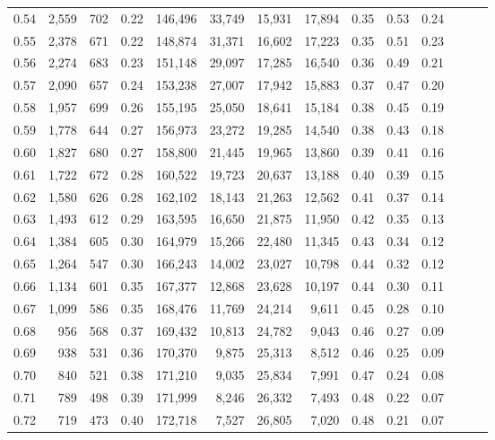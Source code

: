 \begin{tabular}{rrrrrrrrrrrrrr}
0.54 &  2,559 &  702 &  0.22 &  146,496 &   33,749 &  15,931 &  17,894 &  0.35 &  0.53 &      0.24 \\
0.55 &  2,378 &  671 &  0.22 &  148,874 &   31,371 &  16,602 &  17,223 &  0.35 &  0.51 &      0.23 \\
0.56 &  2,274 &  683 &  0.23 &  151,148 &   29,097 &  17,285 &  16,540 &  0.36 &  0.49 &      0.21 \\
0.57 &  2,090 &  657 &  0.24 &  153,238 &   27,007 &  17,942 &  15,883 &  0.37 &  0.47 &      0.20 \\
0.58 &  1,957 &  699 &  0.26 &  155,195 &   25,050 &  18,641 &  15,184 &  0.38 &  0.45 &      0.19 \\
0.59 &  1,778 &  644 &  0.27 &  156,973 &   23,272 &  19,285 &  14,540 &  0.38 &  0.43 &      0.18 \\
0.60 &  1,827 &  680 &  0.27 &  158,800 &   21,445 &  19,965 &  13,860 &  0.39 &  0.41 &      0.16 \\
0.61 &  1,722 &  672 &  0.28 &  160,522 &   19,723 &  20,637 &  13,188 &  0.40 &  0.39 &      0.15 \\
0.62 &  1,580 &  626 &  0.28 &  162,102 &   18,143 &  21,263 &  12,562 &  0.41 &  0.37 &      0.14 \\
0.63 &  1,493 &  612 &  0.29 &  163,595 &   16,650 &  21,875 &  11,950 &  0.42 &  0.35 &      0.13 \\
0.64 &  1,384 &  605 &  0.30 &  164,979 &   15,266 &  22,480 &  11,345 &  0.43 &  0.34 &      0.12 \\
0.65 &  1,264 &  547 &  0.30 &  166,243 &   14,002 &  23,027 &  10,798 &  0.44 &  0.32 &      0.12 \\
0.66 &  1,134 &  601 &  0.35 &  167,377 &   12,868 &  23,628 &  10,197 &  0.44 &  0.30 &      0.11 \\
0.67 &  1,099 &  586 &  0.35 &  168,476 &   11,769 &  24,214 &   9,611 &  0.45 &  0.28 &      0.10 \\
0.68 &    956 &  568 &  0.37 &  169,432 &   10,813 &  24,782 &   9,043 &  0.46 &  0.27 &      0.09 \\
0.69 &    938 &  531 &  0.36 &  170,370 &    9,875 &  25,313 &   8,512 &  0.46 &  0.25 &      0.09 \\
0.70 &    840 &  521 &  0.38 &  171,210 &    9,035 &  25,834 &   7,991 &  0.47 &  0.24 &      0.08 \\
0.71 &    789 &  498 &  0.39 &  171,999 &    8,246 &  26,332 &   7,493 &  0.48 &  0.22 &      0.07 \\
0.72 &    719 &  473 &  0.40 &  172,718 &    7,527 &  26,805 &   7,020 &  0.48 &  0.21 &      0.07 \\

\end{tabular}
